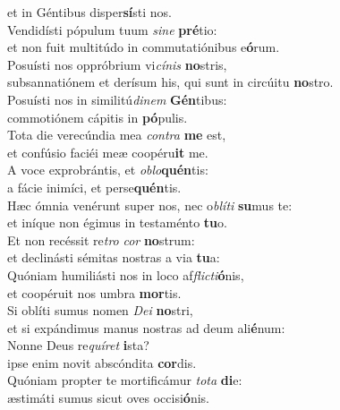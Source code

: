 \oddverse et in Géntibus disper\textbf{sí}sti nos.\\
\evenverse Vendidísti pópulum tuum \textit{si}\textit{ne} \textbf{pré}tio:~\*\\
\evenverse et non fuit multitúdo in commutatiónibus e\textbf{ó}rum.\\
\oddverse Posuísti nos oppróbrium vi\textit{cí}\textit{nis} \textbf{no}stris,~\*\\
\oddverse subsannatiónem et derísum his, qui sunt in circúitu \textbf{no}stro.\\
\evenverse Posuísti nos in similitú\textit{di}\textit{nem} \textbf{Gén}tibus:~\*\\
\evenverse commotiónem cápitis in \textbf{pó}pulis.\\
\oddverse Tota die verecúndia mea \textit{con}\textit{tra} \textbf{me} est,~\*\\
\oddverse et confúsio faciéi meæ coopéru\textbf{it} me.\\
\evenverse A voce exprobrántis, et \textit{o}\textit{blo}\textbf{quén}tis:~\*\\
\evenverse a fácie inimíci, et perse\textbf{quén}tis.\\
\oddverse Hæc ómnia venérunt super nos, nec o\textit{blí}\textit{ti} \textbf{su}mus te:~\*\\
\oddverse et iníque non égimus in testaménto \textbf{tu}o.\\
\evenverse Et non recéssit re\textit{tro} \textit{cor} \textbf{no}strum:~\*\\
\evenverse et declinásti sémitas nostras a via \textbf{tu}a:\\
\oddverse Quóniam humiliásti nos in loco af\textit{fli}\textit{cti}\textbf{ó}nis,~\*\\
\oddverse et coopéruit nos umbra \textbf{mor}tis.\\
\evenverse Si oblíti sumus nomen \textit{De}\textit{i} \textbf{no}stri,~\*\\
\evenverse et si expándimus manus nostras ad deum ali\textbf{é}num:\\
\oddverse Nonne Deus re\textit{quí}\textit{ret} \textbf{i}sta?~\*\\
\oddverse ipse enim novit abscóndita \textbf{cor}dis.\\
\evenverse Quóniam propter te mortificámur \textit{to}\textit{ta} \textbf{di}e:~\*\\
\evenverse æstimáti sumus sicut oves occisi\textbf{ó}nis.\\
